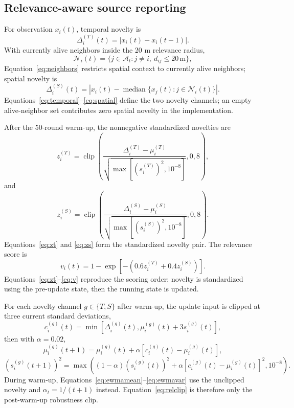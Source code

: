 \documentclass[pdflatex,sn-mathphys-num]{sn-jnl}
\begin{document}
\subsection{Relevance-aware source reporting}

For observation $x_i(t)$, temporal novelty is
\begin{equation}
\Delta_i^{(T)}(t)=|x_i(t)-x_i(t-1)|.
\label{eq:temporal}
\end{equation}
With currently alive neighbors inside the 20 m relevance radius,
\begin{equation}
\mathcal{N}_i(t)=\{j\in\mathcal{A}_t:j\ne i,\ d_{ij}\le20\,\mathrm{m}\},
\label{eq:neighbors}
\end{equation}
Equation~\eqref{eq:neighbors} restricts spatial context to currently alive neighbors; spatial novelty is
\begin{equation}
\Delta_i^{(S)}(t)=\left|x_i(t)-\operatorname{median}\{x_j(t):j\in\mathcal{N}_i(t)\}\right|.
\label{eq:spatial}
\end{equation}
Equations~\eqref{eq:temporal}--\eqref{eq:spatial} define the two novelty channels; an empty alive-neighbor set contributes zero spatial novelty in the implementation.

After the 50-round warm-up, the nonnegative standardized novelties are
\begin{equation}
z_i^{(T)}=\operatorname{clip}\!\left(\frac{\Delta_i^{(T)}-\mu_i^{(T)}}{\sqrt{\max[(s_i^{(T)})^2,10^{-8}]}},0,8\right),
\label{eq:zt}
\end{equation}
and
\begin{equation}
z_i^{(S)}=\operatorname{clip}\!\left(\frac{\Delta_i^{(S)}-\mu_i^{(S)}}{\sqrt{\max[(s_i^{(S)})^2,10^{-8}]}},0,8\right).
\label{eq:zs}
\end{equation}
Equations~\eqref{eq:zt} and \eqref{eq:zs} form the standardized novelty pair. The relevance score is
\begin{equation}
v_i(t)=1-\exp[-(0.6z_i^{(T)}+0.4z_i^{(S)})].
\label{eq:v}
\end{equation}
Equations~\eqref{eq:zt}--\eqref{eq:v} reproduce the scoring order: novelty is standardized using the pre-update state, then the running state is updated.

For each novelty channel $g\in\{T,S\}$ after warm-up, the update input is clipped at three current standard deviations,
\begin{equation}
c_i^{(g)}(t)=\min\!\left[\Delta_i^{(g)}(t),\mu_i^{(g)}(t)+3s_i^{(g)}(t)\right],
\label{eq:relclip}
\end{equation}
then with $\alpha=0.02$,
\begin{equation}
\mu_i^{(g)}(t+1)=\mu_i^{(g)}(t)+\alpha[c_i^{(g)}(t)-\mu_i^{(g)}(t)],
\label{eq:ewmamean}
\end{equation}
\begin{equation}
(s_i^{(g)}(t+1))^2=\max\!\left((1-\alpha)(s_i^{(g)}(t))^2+\alpha[c_i^{(g)}(t)-\mu_i^{(g)}(t)]^2,10^{-8}\right).
\label{eq:ewmavar}
\end{equation}
During warm-up, Equations~\eqref{eq:ewmamean}--\eqref{eq:ewmavar} use the unclipped novelty and $\alpha_t=1/(t+1)$ instead. Equation~\eqref{eq:relclip} is therefore only the post-warm-up robustness clip.
\end{document}

